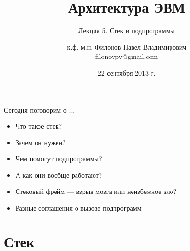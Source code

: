 \documentclass[utf8, russian]{beamer}
\title{Архитектура ЭВМ}
\subtitle{Лекция 5. Стек и подпрограммы}
\author{к.ф.-м.н. Филонов Павел Владимирович \\ filonovpv@gmail.com}
\date{22 сентября 2013 г.}
\institute[МГТУ ГА] 
{
    Московский Государственный Технический Университет \\
    Гражданской Авиации
}
\begin{document}
    \frame{\titlepage}
    \begin{frame}{Сегодня поговорим о ...}
        \begin{itemize}
            \pause
            \item Что такое стек?
            \pause
            \item Зачем он нужен?
            \pause 
            \item Чем помогут подпрограммы?
            \pause
            \item А как они вообще работают?
            \pause
            \item Стековый фрейм --- взрыв мозга или неизбежное зло?
            \pause
            \item Разные соглашения о вызове подпрограмм
        \end{itemize}
    \end{frame}
    \section{Стек}
\end{document}
